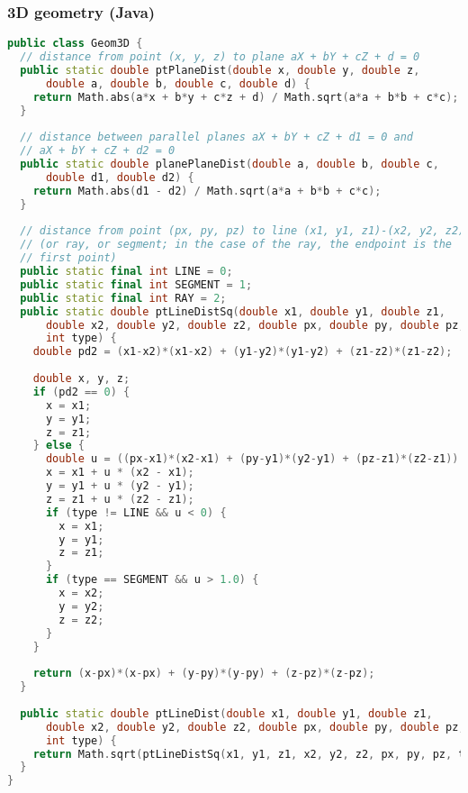 \subsubsection{3D geometry (Java)}
\begin{lstlisting}[language=C++]
public class Geom3D {
  // distance from point (x, y, z) to plane aX + bY + cZ + d = 0
  public static double ptPlaneDist(double x, double y, double z,
      double a, double b, double c, double d) {
    return Math.abs(a*x + b*y + c*z + d) / Math.sqrt(a*a + b*b + c*c);
  }
  
  // distance between parallel planes aX + bY + cZ + d1 = 0 and
  // aX + bY + cZ + d2 = 0
  public static double planePlaneDist(double a, double b, double c,
      double d1, double d2) {
    return Math.abs(d1 - d2) / Math.sqrt(a*a + b*b + c*c);
  }
  
  // distance from point (px, py, pz) to line (x1, y1, z1)-(x2, y2, z2)
  // (or ray, or segment; in the case of the ray, the endpoint is the
  // first point)
  public static final int LINE = 0;
  public static final int SEGMENT = 1;
  public static final int RAY = 2;
  public static double ptLineDistSq(double x1, double y1, double z1,
      double x2, double y2, double z2, double px, double py, double pz,
      int type) {
    double pd2 = (x1-x2)*(x1-x2) + (y1-y2)*(y1-y2) + (z1-z2)*(z1-z2);
    
    double x, y, z;
    if (pd2 == 0) {
      x = x1;
      y = y1;
      z = z1;
    } else {
      double u = ((px-x1)*(x2-x1) + (py-y1)*(y2-y1) + (pz-z1)*(z2-z1)) / pd2;
      x = x1 + u * (x2 - x1);
      y = y1 + u * (y2 - y1);
      z = z1 + u * (z2 - z1);
      if (type != LINE && u < 0) {
        x = x1;
        y = y1;
        z = z1;
      }
      if (type == SEGMENT && u > 1.0) {
        x = x2;
        y = y2;
        z = z2;
      }
    }
    
    return (x-px)*(x-px) + (y-py)*(y-py) + (z-pz)*(z-pz);
  }
  
  public static double ptLineDist(double x1, double y1, double z1,
      double x2, double y2, double z2, double px, double py, double pz,
      int type) {
    return Math.sqrt(ptLineDistSq(x1, y1, z1, x2, y2, z2, px, py, pz, type));
  }
}

\end{lstlisting}
